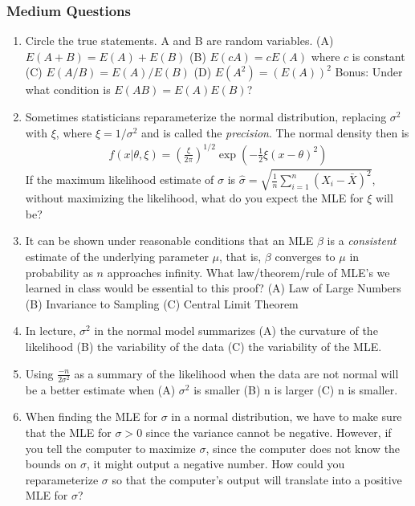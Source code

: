 \documentclass[11pt]{article}
\begin{document}
\subsubsection{Medium Questions}
\begin{enumerate}
\item Circle the true statements.  A and B are random variables.  (A) $E(A + B) = E(A) + E(B)$  (B) $E(cA) = cE(A)$ where $c$ is constant  (C)  $E(A/B) = E(A)/E(B)$  (D) $E(A^2) = (E(A))^2$ Bonus: Under what condition is $E(AB) = E(A)E(B)$? 

\item Sometimes statisticians reparameterize the normal distribution, replacing $\sigma^2$ with $\xi$, where $\xi = 1/\sigma^2$ and is called the \emph{precision}.  The normal density then is
\begin{eqnarray*}
f(x|\theta, \xi) = \left(\frac{\xi}{2\pi}\right)^{1/2} \exp{\left(-\frac{1}{2}\xi(x-\theta)^2\right)}
\end{eqnarray*}
If the maximum likelihood estimate of $\sigma$ is $\hat{\sigma} = \sqrt{\frac{1}{n} \sum_{i=1}^{n} (X_i - \bar{X})^2}$, without maximizing the likelihood, what do you expect the MLE for $\xi$ will be? 

\item It can be shown under reasonable conditions that an MLE $\beta$ is a \emph{consistent} estimate of the underlying parameter $\mu$, that is, $\beta$ converges to $\mu$ in probability as $n$ approaches infinity.  What law/theorem/rule of MLE's we learned in class would be essential to this proof?  (A) Law of Large Numbers (B) Invariance to Sampling (C) Central Limit Theorem 

\item In lecture, $\sigma^2$ in the normal model summarizes (A) the curvature of the likelihood (B) the variability of the data (C) the variability of the MLE.  

\item Using $\frac{-n}{2\sigma^2}$ as a summary of the likelihood when the data are not normal will be a better estimate when (A) $\sigma^2$ is smaller (B) n is larger (C) n is smaller. 

\item When finding the MLE for $\sigma$ in a normal distribution, we have to make sure that the MLE for $\sigma > 0$ since the variance cannot be negative.  However, if you tell the computer to maximize $\sigma$, since the computer does not know the bounds on $\sigma$, it might output a negative number.  How could you reparameterize $\sigma$ so that the computer's output will translate into a positive MLE for $\sigma$? 


\end{enumerate}
\end{document}
